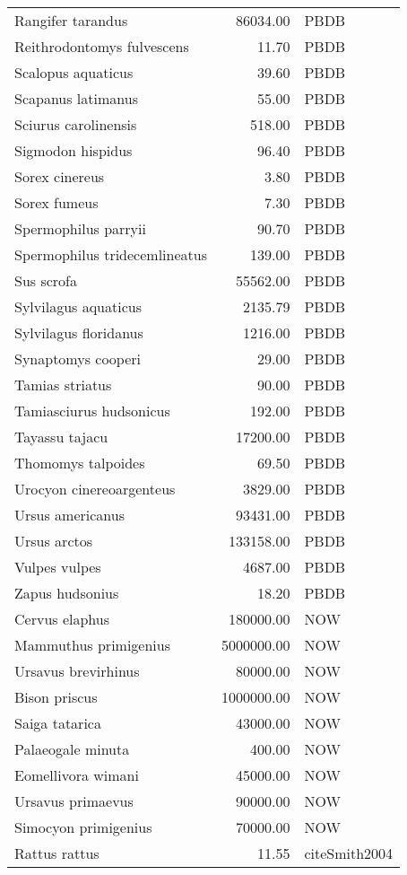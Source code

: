 \begin{table}[ht]
\begin{tabular}{lrl}
  Rangifer tarandus & 86034.00 & PBDB \\ 
  Reithrodontomys fulvescens & 11.70 & PBDB \\ 
  Scalopus aquaticus & 39.60 & PBDB \\ 
  Scapanus latimanus & 55.00 & PBDB \\ 
  Sciurus carolinensis & 518.00 & PBDB \\ 
  Sigmodon hispidus & 96.40 & PBDB \\ 
  Sorex cinereus & 3.80 & PBDB \\ 
  Sorex fumeus & 7.30 & PBDB \\ 
  Spermophilus parryii & 90.70 & PBDB \\ 
  Spermophilus tridecemlineatus & 139.00 & PBDB \\ 
  Sus scrofa & 55562.00 & PBDB \\ 
  Sylvilagus aquaticus & 2135.79 & PBDB \\ 
  Sylvilagus floridanus & 1216.00 & PBDB \\ 
  Synaptomys cooperi & 29.00 & PBDB \\ 
  Tamias striatus & 90.00 & PBDB \\ 
  Tamiasciurus hudsonicus & 192.00 & PBDB \\ 
  Tayassu tajacu & 17200.00 & PBDB \\ 
  Thomomys talpoides & 69.50 & PBDB \\ 
  Urocyon cinereoargenteus & 3829.00 & PBDB \\ 
  Ursus americanus & 93431.00 & PBDB \\ 
  Ursus arctos & 133158.00 & PBDB \\ 
  Vulpes vulpes & 4687.00 & PBDB \\ 
  Zapus hudsonius & 18.20 & PBDB \\ 
  Cervus elaphus & 180000.00 & NOW \\ 
  Mammuthus primigenius & 5000000.00 & NOW \\ 
  Ursavus brevirhinus & 80000.00 & NOW \\ 
  Bison priscus & 1000000.00 & NOW \\ 
  Saiga tatarica & 43000.00 & NOW \\ 
  Palaeogale minuta & 400.00 & NOW \\ 
  Eomellivora wimani & 45000.00 & NOW \\ 
  Ursavus primaevus & 90000.00 & NOW \\ 
  Simocyon primigenius & 70000.00 & NOW \\ 
  Rattus rattus & 11.55 & cite{Smith2004} \\ 

\end{tabular}
\end{table}
